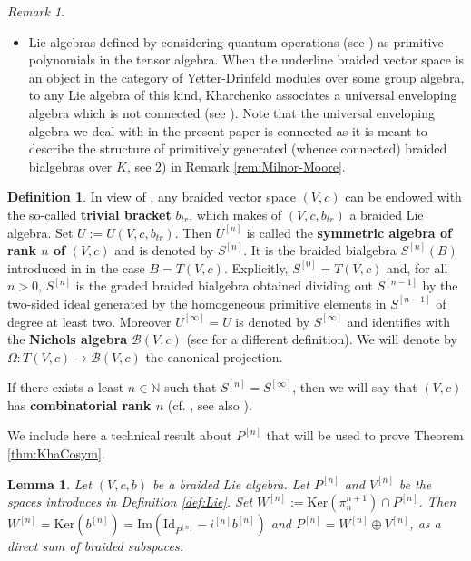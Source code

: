 \documentclass[english]{amsart}
\numberwithin{equation}{section}
\numberwithin{figure}{section}
\theoremstyle{plain}
\theoremstyle{definition}
\newtheorem{defn}[thm]{Definition}
\theoremstyle{definition}
\theoremstyle{remark}
\theoremstyle{remark}
\newtheorem{rem}[thm]{Remark}
\theoremstyle{plain}
\newtheorem{lem}[thm]{Lemma}
\theoremstyle{plain}
\theoremstyle{plain}
\begin{document}
\begin{rem}
\begin{itemize}
\item Lie algebras defined by considering quantum operations (see \cite[Definition 2.2]{Kharchenko-AnAlgSkew}) as primitive polynomials in the
tensor algebra. When the underline braided vector space is an object in the category of Yetter-Drinfeld modules over some group algebra, to any Lie algebra of this kind, Kharchenko associates a universal
enveloping algebra which is not connected (see \cite{Kharchenko-SkewPrim}). Note that the universal
enveloping algebra we deal with in the present paper is connected as it is meant to describe the structure of primitively generated (whence connected)
braided bialgebras over $K$, see 2) in Remark \ref{rem:Milnor-Moore}.
\end{itemize}
\end{rem}




\begin{defn}
\label{def:SymAlg}In view of \cite[Example 7.1]{Ardizzoni-MMPrim},
any braided vector space $\left(V,c\right)$ can be endowed with the
so-called \textbf{trivial bracket} $b_{tr}$, which makes of $\left(V,c,b_{tr}\right)$
a braided Lie algebra. Set $U:=U\left(V,c,b_{tr}\right)$. Then $U^{[n]}$
is called the \textbf{symmetric algebra of rank $n$ of }$\left(V,c\right)$
and is denoted by $S^{[n]}$. It is the braided bialgebra $S^{\left[n\right]}\left(B\right)$
introduced in \cite[Definition 3.10]{Ardizzoni-Sdeg} in the case
$B=T(V,c)$. Explicitly, $S^{[0]}=T(V,c)$ and, for all $n>0$, $S^{[n]}$
is the graded braided bialgebra obtained dividing out $S^{[n-1]}$
by the two-sided ideal generated by the homogeneous primitive elements
in $S^{[n-1]}$ of degree at least two. Moreover $U^{[\infty]}=U$ is denoted by $S^{[\infty]}$ and
identifies with the \textbf{Nichols algebra} $\mathcal{B}\left(V,c\right)$
(see \cite[5.3]{Ardizzoni-Sdeg} for a different definition). We will
denote by $\Omega:T(V,c)\rightarrow\mathcal{B}\left(V,c\right)$ the
canonical projection. 

If there exists a least $n\in\mathbb{N}$ such that $S^{[n]}=S^{[\infty]}$,
then we will say that $(V,c)$ has \textbf{combinatorial rank $n$}
(cf. \cite[Definition 5.4]{Kharchenko-SkewPrim}, see also \cite[Section 5]{Ardizzoni-Sdeg}). 
\end{defn}

We include here a technical result about $P^{[n]}$ that will be used to prove Theorem \ref{thm:KhaCosym}.
\begin{lem}\label{lem:Psplits} 
 Let $\left(V,c,b\right)$ be a braided Lie algebra. Let $P^{\left[n\right]}$ and $V^{\left[n\right]}$ be the spaces introduces in Definition \ref{def:Lie}. Set $W^{\left[n\right]}:=\mathrm{Ker}\left(\pi_{n}^{n+1}\right)\cap P^{\left[n\right]}$. Then $W^{\left[n\right]}=\mathrm{Ker}\left(b^{\left[n\right]}\right)=\mathrm{Im}\left(\mathrm{Id}_{P^{\left[n\right]}}-i^{\left[n\right]}b^{\left[n\right]}\right)$
and $P^{\left[n\right]}=W^{\left[n\right]}\oplus V^{\left[n\right]}$,
as a direct sum of braided subspaces.
\end{lem}
\end{document}

